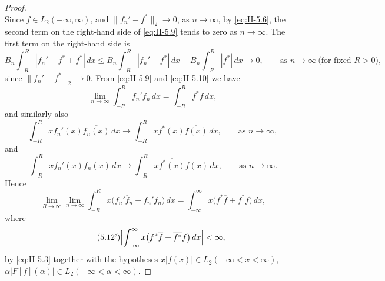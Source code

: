 \begin{proof}
\begin{equation}
\end{equation}
Since $f\in L_{2}(-\infty,\infty)$, and $\|f_{n}'-f^{*}\|_{2}\to 0$, as $n\to\infty$, by \eqref{eq:II-5.6}, the second term on the right-hand side of \eqref{eq:II-5.9} tends to zero as $n\to\infty$. The first term on the right-hand side is
\begin{equation}\tag{5.10}\label{eq:II-5.10}
B_{n}\int_{-R}^{R}|f_{n}'-f^{*}+f^{*}|\,dx
\le B_{n}\int_{-R}^{R}|f_{n}'-f^{*}|\,dx+B_{n}\int_{-R}^{R}|f^{*}|\,dx
\to 0,\qquad\text{as }n\to\infty\ \text{(for fixed }R>0),
\end{equation}
since $\|f_{n}'-f^{*}\|_{2}\to 0$. From \eqref{eq:II-5.9} and \eqref{eq:II-5.10} we have
\begin{equation}\tag{5.11}\label{eq:II-5.11}
\lim_{n\to\infty}\int_{-R}^{R}f_{n}'\overline{f}_{n}\,dx
=\int_{-R}^{R}f^{*}\overline{f}\,dx,
\end{equation}
and similarly also
\[
\int_{-R}^{R}x f_{n}'(x)\overline{f_{n}(x)}\,dx\to\int_{-R}^{R}x f^{*}(x)\overline{f(x)}\,dx,\qquad\text{as }n\to\infty,
\]
and
\[
\int_{-R}^{R}x\overline{f_{n}'(x)}f_{n}(x)\,dx\to\int_{-R}^{R}x\overline{f^{*}(x)}f(x)\,dx,\qquad\text{as }n\to\infty.
\]
Hence
\begin{equation}\tag{5.12}\label{eq:II-5.12}
\lim_{R\to\infty}\lim_{n\to\infty}\int_{-R}^{R}x\bigl(f_{n}'\overline{f}_{n}+\overline{f_{n}'}f_{n}\bigr)\,dx
=\int_{-\infty}^{\infty}x\bigl(f^{*}\overline{f}+\overline{f^{*}}f\bigr)\,dx,
\end{equation}
where
\begin{equation}\tag{5.12'}\label{eq:II-5.12p}
\Bigl|\int_{-\infty}^{\infty}x\bigl(f^{*}\overline{f}+\overline{f^{*}}f\bigr)\,dx\Bigr|<\infty,
\end{equation}
by \eqref{eq:II-5.3} together with the hypotheses $x|f(x)|\in L_{2}(-\infty<x<\infty)$, $\alpha|F[f](\alpha)|\in L_{2}(-\infty<\alpha<\infty)$.


\end{proof}
